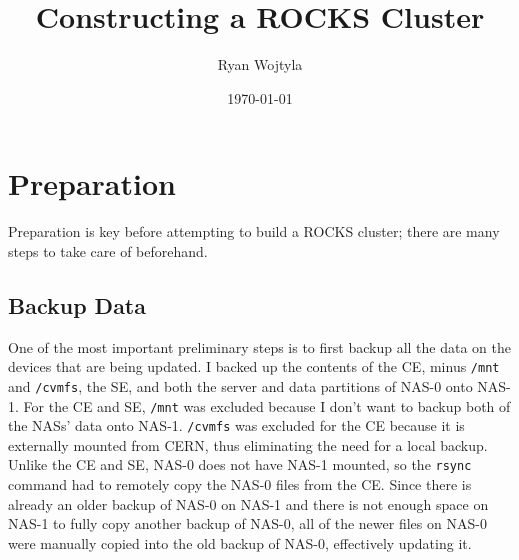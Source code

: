 \documentclass[12pt]{article}
\begin{document}

\title{Constructing a ROCKS Cluster}

\date{\today}

\author{Ryan Wojtyla}

\thispagestyle{empty}

\maketitle



\section{Preparation}

\qq Preparation is key before attempting to build a ROCKS cluster; there are
many steps to take care of beforehand.

\subsection{Backup Data}

\qq One of the most important preliminary steps is to first backup all the data
on the devices that are being updated. I backed up the contents of the CE, minus
{\tt /mnt} and {\tt /cvmfs}, the SE, and both the server and data partitions of
NAS-0 onto NAS-1. For the CE and SE, {\tt /mnt} was excluded because I don't want
to backup both of the NASs' data onto NAS-1. {\tt /cvmfs} was excluded for the CE
because it is externally mounted from CERN, thus eliminating the need for a
local backup. Unlike the CE and SE, NAS-0 does not have NAS-1 mounted, so the
{\tt rsync} command had to remotely copy the NAS-0 files from the CE. Since there
is already an older backup of NAS-0 on NAS-1 and there is not enough space on
NAS-1 to fully copy another backup of NAS-0, all of the newer files on NAS-0
were manually copied into the old backup of NAS-0, effectively updating it.
\end{document}
